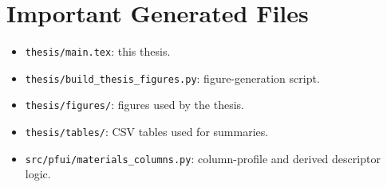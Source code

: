 \documentclass[12pt,a4paper,oneside]{report}
\begin{document}
\chapter{Important Generated Files}

\begin{itemize}
  \item \texttt{thesis/main.tex}: this thesis.
  \item \texttt{thesis/build\_thesis\_figures.py}: figure-generation script.
  \item \texttt{thesis/figures/}: figures used by the thesis.
  \item \texttt{thesis/tables/}: CSV tables used for summaries.
  \item \texttt{src/pfui/materials\_columns.py}: column-profile and derived
  descriptor logic.
\end{itemize}



\end{document}
